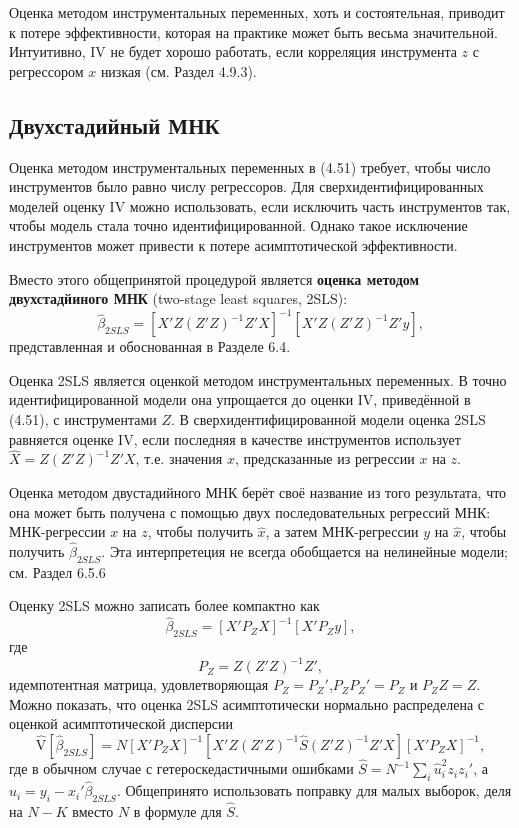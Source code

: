 Оценка методом инструментальных переменных, хоть и состоятельная, приводит к потере эффективности, которая на практике может быть весьма значительной. Интуитивно, IV не будет хорошо работать, если корреляция инструмента $z$ с регрессором $x$ низкая (см. Раздел 4.9.3).

\subsection{Двухстадийный МНК}

Оценка методом инструментальных переменных в (4.51) требует, чтобы число инструментов было равно числу регрессоров. Для сверхидентифицированных моделей оценку IV можно использовать, если исключить часть инструментов так, чтобы модель стала точно идентифицированной. Однако такое исключение инструментов может привести к потере асимптотической эффективности.

Вместо этого общепринятой процедурой является \textbf{оценка методом двухстадйиного МНК} (two-stage least squares, 2SLS):
\begin{equation}
\hat{\beta}_{2SLS} = [X'Z(Z'Z)^{-1}Z'X]^{-1}[X'Z(Z'Z)^{-1}Z'y],
\end{equation}
представленная и обоснованная в Разделе 6.4.

Оценка 2SLS является оценкой методом инструментальных переменных. В точно идентифицированной модели она упрощается до оценки IV, приведённой в (4.51), с инструментами $Z$. В сверхидентифицированной модели оценка 2SLS равняется оценке IV, если последняя в качестве инструментов использует $\hat{X}=Z(Z'Z)^{-1}Z'X$, т.е. значения $x$, предсказанные из регрессии $x$ на $z$.

Оценка методом двустадийного МНК берёт своё название из того результата, что она может быть получена с помощью двух последовательных регрессий МНК: МНК-регрессии $x$ на $z$, чтобы получить $\hat{x}$, а затем МНК-регрессии $y$ на $\hat{x}$, чтобы получить $\hat{\beta}_{2SLS}$. Эта интерпретеция не всегда обобщается на нелинейные модели; см. Раздел 6.5.6

Оценку 2SLS можно записать более компактно как 
\begin{equation}
\hat{\beta}_{2SLS} = [X'P_ZX]^{-1}[X'P_Zy],
\end{equation}
где
$$
P_Z = Z(Z'Z)^{-1}Z',
$$
идемпотентная матрица, удовлетворяющая $P_Z = P_Z'$,$P_Z P_Z' = P_Z$ и $P_Z Z = Z$. Можно показать, что оценка 2SLS асимптотически нормально распределена с оценкой асимптотической дисперсии
\begin{equation}
\hat{\mathrm{V}}[\hat{\beta}_{2SLS}] =N[X'P_ZX]^{-1}[X'Z(Z'Z)^{-1}\hat{S}(Z'Z)^{-1}Z'X][X'P_ZX]^{-1},
\end{equation}
где в обычном случае с гетероскедастичными ошибками $\hat{S} = N^{-1}\sum_i\hat{u}_i^2 z_i z_i'$, а $\hat{u}_i = y_i - x_i'\hat{\beta}_{2SLS}$. Общепринято использовать поправку для малых выборок, деля на $N-K$ вместо $N$ в формуле для $\hat{S}$.

